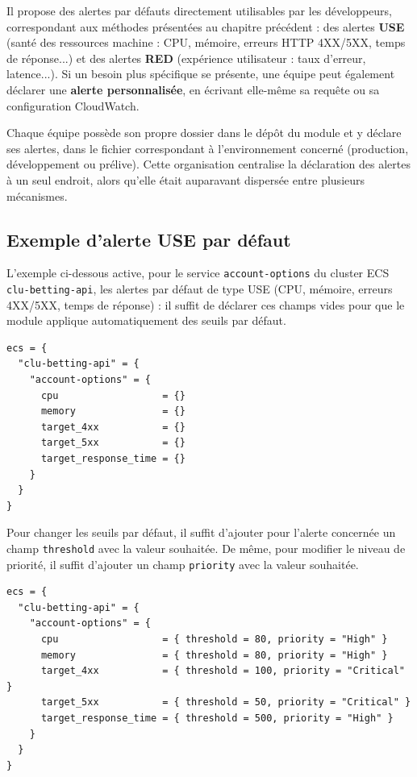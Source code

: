 Il propose des alertes par défauts directement utilisables par les développeurs, correspondant aux méthodes présentées au chapitre
précédent : des alertes \textbf{USE} (santé des ressources machine : CPU, mémoire, erreurs HTTP
4XX/5XX, temps de réponse...) et des alertes \textbf{RED} (expérience utilisateur : taux d'erreur,
latence...). Si un besoin plus spécifique se présente, une équipe peut également déclarer une \textbf{alerte
personnalisée}, en écrivant elle-même sa requête  ou sa configuration
CloudWatch.

Chaque équipe possède son propre dossier dans le dépôt du module et y déclare ses alertes, dans le
fichier correspondant à l'environnement concerné (production, développement ou prélive).
Cette organisation centralise la déclaration des alertes à un seul endroit, alors qu'elle était auparavant
dispersée entre plusieurs mécanismes.

\subsection{Exemple d'alerte USE par défaut}

L'exemple ci-dessous active, pour le service \texttt{account-options} du cluster ECS
\texttt{clu-betting-api}, les alertes par défaut de type USE (CPU, mémoire, erreurs 4XX/5XX, temps de
réponse) : il suffit de déclarer ces champs vides pour que le module applique automatiquement des
seuils par défaut.

\begin{lstlisting}[style=codestyleblack, language=HCL, caption={Activation d'alertes USE par défaut sur un service ECS}, label={lst:use-example}]
ecs = {
  "clu-betting-api" = {
    "account-options" = {
      cpu                  = {}
      memory               = {}
      target_4xx           = {}
      target_5xx           = {}
      target_response_time = {}
    }
  }
}
\end{lstlisting}

Pour changer les seuils par défaut, il suffit d'ajouter pour l'alerte concernée un champ \texttt{threshold} avec la valeur souhaitée. 
De même, pour modifier le niveau de priorité, il suffit d'ajouter un champ \texttt{priority} avec la valeur souhaitée.

\begin{lstlisting}[style=codestyleblack, language=HCL, caption={Activation d'alertes USE avec seuils et priorités personnalisés sur un service ECS}, label={lst:use-example-custom}]
ecs = {
  "clu-betting-api" = {
    "account-options" = {
      cpu                  = { threshold = 80, priority = "High" }
      memory               = { threshold = 80, priority = "High" }
      target_4xx           = { threshold = 100, priority = "Critical" }
      target_5xx           = { threshold = 50, priority = "Critical" }
      target_response_time = { threshold = 500, priority = "High" }
    }
  }
}
\end{lstlisting}

